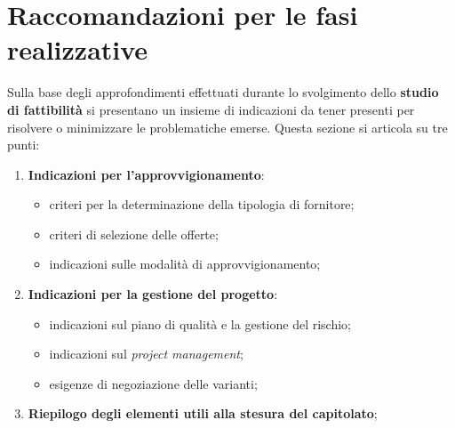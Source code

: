 \section{Raccomandazioni per le fasi realizzative}\label{sec:ftt_raccomandazioni_per_le_fasi_realizzative} %
Sulla base degli approfondimenti effettuati durante lo svolgimento dello \textbf{studio di fattibilità} si presentano un insieme di indicazioni da tener presenti per risolvere o minimizzare le problematiche emerse.
Questa sezione si articola su tre punti:
\begin{enumerate}
    \item \textbf{Indicazioni per l'approvvigionamento}:
        \begin{itemize}
            \item criteri per la determinazione della tipologia di fornitore;
            \item criteri di selezione delle offerte;
            \item indicazioni sulle modalità di approvvigionamento;
        \end{itemize}
    \item \textbf{Indicazioni per la gestione del progetto}:
        \begin{itemize}
            \item indicazioni sul piano di qualità e la gestione del rischio;
            \item indicazioni sul \textit{project management};
            \item esigenze di negoziazione delle varianti;
        \end{itemize}
    \item \textbf{Riepilogo degli elementi utili alla stesura del capitolato};
\end{enumerate}
